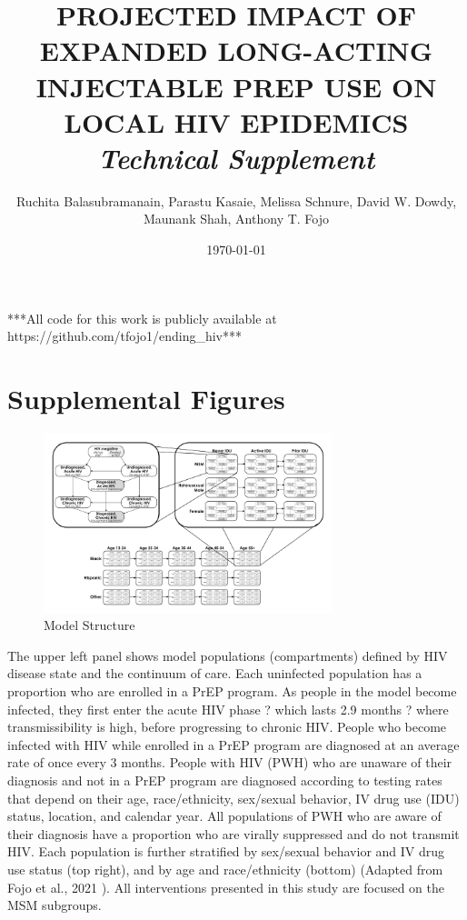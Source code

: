 \documentclass{article}
\begin{document}
	
\setcounter{tocdepth}{4} 
\setcounter{secnumdepth}{4}	
	
\title{PROJECTED IMPACT OF EXPANDED LONG-ACTING INJECTABLE PREP USE ON LOCAL HIV EPIDEMICS \\
	\textit{Technical Supplement}}
\date{\today}
\author{Ruchita Balasubramanain, Parastu Kasaie, Melissa Schnure, David W. Dowdy, Maunank Shah, Anthony T. Fojo}

\maketitle
{}

\setcounter{tocdepth}{2}
\tableofcontents

\vfill
***All code for this work is publicly available at https://github.com/tfojo1/ending\_hiv***
\pagebreak





\section{Supplemental Figures}

\begin{figure}[H]
	\centering
	\caption{Model Structure}
	\includegraphics[width=0.75\textwidth]{images/FigureS1}
\end{figure}
The upper left panel shows model populations (compartments) defined by HIV disease state and the continuum of care. Each uninfected population has a proportion who are enrolled in a PrEP program. As people in the model become infected, they first enter the acute HIV phase ? which lasts 2.9 months ? where transmissibility is high, before progressing to chronic HIV. People who become infected with HIV while enrolled in a PrEP program are diagnosed at an average rate of once every 3 months. People with HIV (PWH) who are unaware of their diagnosis and not in a PrEP program are diagnosed according to testing rates that depend on their age, race/ethnicity, sex/sexual behavior, IV drug use (IDU) status, location, and calendar year. All populations of PWH who are aware of their diagnosis have a proportion who are virally suppressed and do not transmit HIV. Each population is further stratified by sex/sexual behavior and IV drug use status (top right), and by age and race/ethnicity (bottom) (Adapted from Fojo et al., 2021 \cite{fojo2021}). All interventions presented in this study are focused on the MSM subgroups. 
\end{document}
